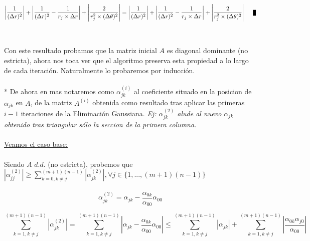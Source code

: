 \begin{equation}
 \left | \frac{1}{(\Delta r)^2} \right | + \left | \frac{1}{(\Delta r)^2} - \frac{1}{r_j \times \Delta r} \right | + \left | \frac{2}{r_j^2 \times (\Delta \theta)^2} \right | = \left | \frac{1}{(\Delta r)^2} \right | + \left | \frac{1}{(\Delta r)^2} - \frac{1}{r_j \times \Delta r} \right | +  \left | \frac{2}{r_j^2 \times (\Delta \theta)^2} \right | \qed
\end{equation}
\\
\\
Con este resultado probamos que la matriz inicial $A$ es diagonal dominante (no estricta), ahora nos toca ver que el algoritmo preserva esta propiedad a lo largo de cada iteraci\'on. Naturalmente lo probaremos por inducci\'on.
\\
\\
* De ahora en mas notaremos como $\alpha_{jk}^{(i)}$ al coeficiente situado en la posicion de $\alpha_{jk}$ en  $A$, de la matriz $A^{(i)}$ obtenida como resultado tras aplicar las primeras $i-1$ iteraciones de la Eliminaci\'on Gaussiana. \textit{Ej: $\alpha_{jk}^{(2)}$ alude al nuevo $\alpha_{jk}$ obtenido tras triangular s\'olo la seccion de la primera columna.}
\\  
\\
\underline{Veamos el caso base:}
\\
\\
Siendo $A$ $d.d.$ (no estricta), probemos que $\left | \alpha_{jj}^{(2)} \right | \geq \sum_{k=0,k \neq j}^{(m+1)(n-1)} \left | \alpha_{jk}^{(2)} \right |, \forall j \in \{1,...,(m+1)(n-1)\}$
\\
\\
\begin{equation}
\alpha_{jk}^{(2)} =  \alpha_{jk} - \frac{\alpha_{0k}}{\alpha_{00}}\alpha_{00}
\end{equation}

\begin{equation}
\sum_{k=1,k \neq j}^{(m+1)(n-1)} \left | \alpha_{jk}^{(2)} \right | = \sum_{k=1,k \neq j}^{(m+1)(n-1)} \left | \alpha_{jk} - \frac{\alpha_{0k}}{\alpha_{00}}\alpha_{00} \right | \leq \sum_{k=1,k \neq j}^{(m+1)(n-1)} \left | \alpha_{jk} \right | + \sum_{k=1,k \neq j}^{(m+1)(n-1)} \left | \frac{\alpha_{0k}\alpha_{j0}}{\alpha_{00}} \right | 
\end{equation}

